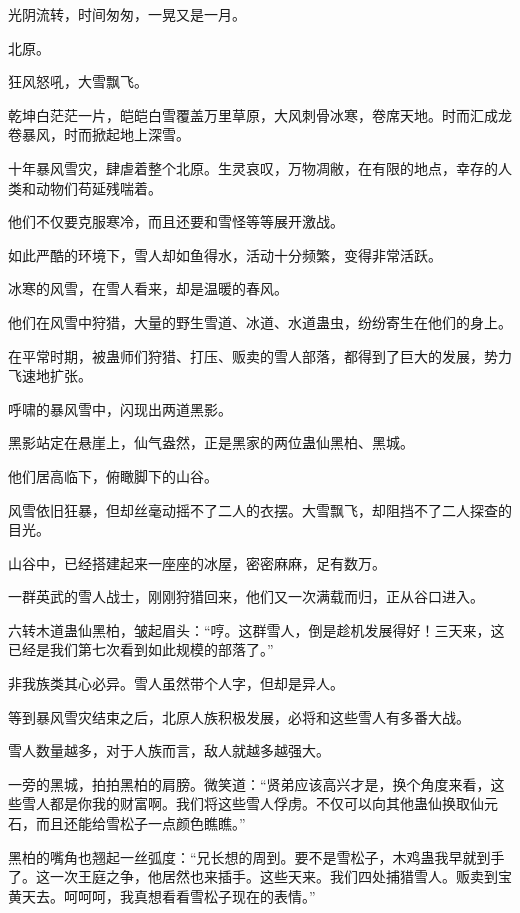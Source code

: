 
\begin{this_body}

光阴流转，时间匆匆，一晃又是一月。

北原。

狂风怒吼，大雪飘飞。

乾坤白茫茫一片，皑皑白雪覆盖万里草原，大风刺骨冰寒，卷席天地。时而汇成龙卷暴风，时而掀起地上深雪。

十年暴风雪灾，肆虐着整个北原。生灵哀叹，万物凋敝，在有限的地点，幸存的人类和动物们苟延残喘着。

他们不仅要克服寒冷，而且还要和雪怪等等展开激战。

如此严酷的环境下，雪人却如鱼得水，活动十分频繁，变得非常活跃。

冰寒的风雪，在雪人看来，却是温暖的春风。

他们在风雪中狩猎，大量的野生雪道、冰道、水道蛊虫，纷纷寄生在他们的身上。

在平常时期，被蛊师们狩猎、打压、贩卖的雪人部落，都得到了巨大的发展，势力飞速地扩张。

呼啸的暴风雪中，闪现出两道黑影。

黑影站定在悬崖上，仙气盎然，正是黑家的两位蛊仙黑柏、黑城。

他们居高临下，俯瞰脚下的山谷。

风雪依旧狂暴，但却丝毫动摇不了二人的衣摆。大雪飘飞，却阻挡不了二人探查的目光。

山谷中，已经搭建起来一座座的冰屋，密密麻麻，足有数万。

一群英武的雪人战士，刚刚狩猎回来，他们又一次满载而归，正从谷口进入。

六转木道蛊仙黑柏，皱起眉头：“哼。这群雪人，倒是趁机发展得好！三天来，这已经是我们第七次看到如此规模的部落了。”

非我族类其心必异。雪人虽然带个人字，但却是异人。

等到暴风雪灾结束之后，北原人族积极发展，必将和这些雪人有多番大战。

雪人数量越多，对于人族而言，敌人就越多越强大。

一旁的黑城，拍拍黑柏的肩膀。微笑道：“贤弟应该高兴才是，换个角度来看，这些雪人都是你我的财富啊。我们将这些雪人俘虏。不仅可以向其他蛊仙换取仙元石，而且还能给雪松子一点颜色瞧瞧。”

黑柏的嘴角也翘起一丝弧度：“兄长想的周到。要不是雪松子，木鸡蛊我早就到手了。这一次王庭之争，他居然也来插手。这些天来。我们四处捕猎雪人。贩卖到宝黄天去。呵呵呵，我真想看看雪松子现在的表情。”


\end{this_body}
